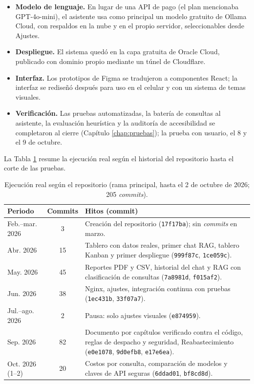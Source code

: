 \begin{itemize}
    \item \textbf{Modelo de lenguaje.} En lugar de una API de pago (el plan mencionaba GPT-4o-mini), el asistente usa como principal un modelo gratuito de Ollama Cloud, con respaldos en la nube y en el propio servidor, seleccionables desde Ajustes.
    \item \textbf{Despliegue.} El sistema quedó en la capa gratuita de Oracle Cloud, publicado con dominio propio mediante un túnel de Cloudflare.
    \item \textbf{Interfaz.} Los prototipos de Figma se tradujeron a componentes React; la interfaz se rediseñó después para uso en el celular y con un sistema de temas visuales.
    \item \textbf{Verificación.} Las pruebas automatizadas, la batería de consultas al asistente, la evaluación heurística y la auditoría de accesibilidad se completaron al cierre (Capítulo \ref{chap:pruebas}); la prueba con usuario, el 8 y el 9 de octubre.
\end{itemize}

La Tabla \ref{tab:ejecucion_real} resume la ejecución real según el historial del repositorio hasta el corte de las pruebas.

\begin{table}[!htbp]
\centering
\small
\caption[Ejecución real según el repositorio.]{Ejecución real según el repositorio (rama principal, hasta el 2 de octubre de 2026; 205 \textit{commits}).}
\label{tab:ejecucion_real}
\begin{tabular}{|l|c|p{10.6cm}|}
\hline
\textbf{Periodo} & \textbf{Commits} & \textbf{Hitos (commit)} \\
\hline
Feb.--mar. 2026 & 3 & Creación del repositorio (\texttt{17f17ba}); sin \textit{commits} en marzo. \\ \hline
Abr. 2026 & 15 & Tablero con datos reales, primer chat RAG, tablero Kanban y primer despliegue (\texttt{999f87c}, \texttt{1ce059c}). \\ \hline
May. 2026 & 45 & Reportes PDF y CSV, historial del chat y RAG con clasificación de consultas (\texttt{7a8981d}, \texttt{f015af2}). \\ \hline
Jun. 2026 & 38 & Nginx, ajustes, integración continua con pruebas (\texttt{1ec431b}, \texttt{33f07a7}). \\ \hline
Jul.--ago. 2026 & 2 & Pausa: solo ajustes visuales (\texttt{e874959}). \\ \hline
Sep. 2026 & 82 & Documento por capítulos verificado contra el código, reglas de despacho y seguridad, Reabastecimiento (\texttt{e0e1078}, \texttt{9d0efb8}, \texttt{e17e6ea}). \\ \hline
Oct. 2026 (1--2) & 20 & Costos por consulta, comparación de modelos y claves de API seguras (\texttt{6ddad01}, \texttt{bf8cd8d}). \\ \hline
\end{tabular}
\end{table}

